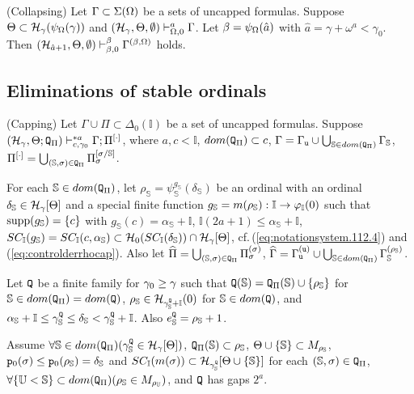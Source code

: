 \documentclass{article}
\newcommand{\mS}{\mathbb{S}}
\newcommand{\mI}{\mathbb{I}}
\newcommand{\mU}{\mathbb{U}}
\begin{document}
\blem\label{lem:Omegacollpase}{\rm (Collapsing)}
Let
$\Gamma\subset\Sigma(\Omega)$ 
be a sets of uncapped formulas.
Suppose
$\Theta\subset
\mathcal{H}_{\gamma}(\psi_{\Omega}(\gamma))$
 and
$
(\mathcal{H}_{\gamma},\Theta,\emptyset
)\vdash^{a}_{\Omega,0}\Gamma
$.
Let
$\beta=\psi_{\Omega}(\hat{a})$ with $\hat{a}=\gamma+\omega^{a}<\gamma_{0}$.
Then 
$(\mathcal{H}_{\hat{a}+1},\Theta, \emptyset)
\vdash^{\beta}_{\beta,0}
\Gamma^{(\beta,\Omega)}$ holds.

\elem



\subsection{Eliminations of stable ordinals}
\blem\label{lem:Mostowskicollpasecap}{\rm (Capping)}
Let
$\Gamma\cup\Pi\subset\Delta_{0}(\mathbb{I})$ be a set of uncapped formulas.
Suppose
$
(\mathcal{H}_{\gamma},\Theta;{\tt Q}_{\Pi}
)\vdash^{* a}_{c,\gamma_{0}}\Gamma;\Pi^{[\cdot]}
$, where
$a,c<\mathbb{I}$, $dom({\tt Q}_{\Pi})\subset c$,
 $\Gam=\Gam_{{\tt u}}\cup\bigcup_{\mS\in dom({\tt Q}_{\Pi})}\Gam_{\mS}$,
 $\Pi^{[\cdot]}=\bigcup_{(\mS,\sigma)\in {\tt Q}_{\Pi}}\Pi_{\sigma}^{[\sigma/\mathbb{S}]}$.




For each $\mS\in dom({\tt Q}_{\Pi})$, 
let 
$\rho_{\mS}=\psi_{\mathbb{S}}^{g_{\mS}}(\delta_{\mS})$
 be an ordinal with an ordinal $\del_{\mS}\in\calh_{\gam}[\Tht]$ and
 a special finite function 
$g_{\mS}=m(\rho_{\mS}):\mI\to\vphi_{\mI}(0)$ such that
${\rm supp}(g_{\mS})=\{c\}$ with $g_{\mS}(c)=\alpha_{\mS}+\mathbb{I}$,
$\mathbb{I}(2a+1)\leq\alpha_{\mS}+\mathbb{I}$,
$SC_{\mI}(g_{\mS})=SC_{\mI}(c,\alp_{\mS})\subset 
\mathcal{H}_{0}(SC_{\mI}(\delta_{\mS}))\cap\mathcal{H}_{\gam}[\Tht]$,
cf.\,(\ref{eq:notationsystem.112.4}) and (\ref{eq:controlderrhocap}).
Also let $\widehat{\Pi}=\bigcup_{(\mS,\sig)\in{\tt Q}_{\Pi}}\Pi_{\sig}^{(\sig)}$, 
$\widehat{\Gam}=\Gam_{{\tt u}}^{({\tt u})}\cup\bigcup_{\mS\in dom({\tt Q}_{\Pi})}\Gam_{\mS}^{(\rho_{\mS})}$.

Let ${\tt Q}$ be a finite family for $\gamma_{0}\geq\gamma$ such that
${\tt Q}(\mS)={\tt Q}_{\Pi}(\mS)\cup\{\rho_{\mS}\}$ for $\mS\in dom({\tt Q}_{\Pi})=dom({\tt Q})$,
$\rho_{\mS}
\in\mathcal{H}_{\gamma_{\mS}^{{\tt Q}}+\mI}(0)$ for $\mS\in dom({\tt Q})$,
and
$\alpha_{\mS}+\mathbb{I}\leq\gamma_{\mS}^{{\tt Q}}\leq\delta_{\mS}<\gamma_{\mS}^{{\tt Q}}+\mI$.
Also $e^{{\tt Q}}_{\mS}=\rho_{\mS}+1$.

Assume 
$\fal\mS\in dom({\tt Q}_{\Pi})(\gam_{\mS}^{{\tt Q}}\in\calh_{\gam}[\Tht])$,
${\tt Q}_{\Pi}(\mS)\subset\rho_{\mS}$,
$\Tht\cup\{\mS\}\subset M_{\rho_{\mS}}$,
${\tt p}_{0}(\sig)\leq{\tt p}_{0}(\rho_{\mS})=\del_{\mS}$ 
and $SC_{\mI}(m(\sig))\subset\calh_{\gam_{\mS}^{{\tt Q}}}[\Tht\cup\{\mS\}]$
for each $(\mS,\sig)\in{\tt Q}_{\Pi}$, 
$\fal\{\mU<\mS\}\subset dom({\tt Q}_{\Pi})(\rho_{\mS}\in M_{\rho_{\mU}})$,
and ${\tt Q}$ has gaps $2^{a}$.
\end{document}
